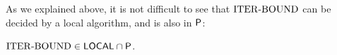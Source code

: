 	As we explained above, it is not difficult to see that ${\mathrm{ITER\text{-}BOUND}}$ can be decided by a local algorithm,
and is also in ${\mathsf{P}}$:
\begin{claim}\label{claimITINalgos}
	${\mathrm{ITER\text{-}BOUND}} \in {\mathsf{LOCAL}} \cap {\mathsf{P}}$.
\end{claim}


